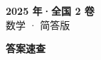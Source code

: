 \documentclass[zihao=-4, a4paper]{ctexart}
\begin{document}
\begin{center}
  {\Large\bfseries 2025 年·全国 2 卷}\\[4pt]
  {\large 数学 · 简答版}
\end{center}
\medskip
{}

\clearpage
{}
\begin{center}{\Large\bfseries 答案速查}\end{center}
\medskip

\end{document}
